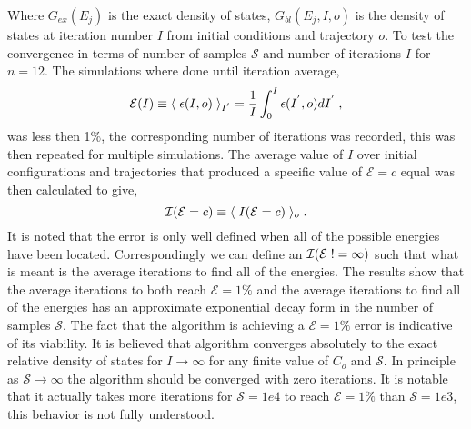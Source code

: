 \documentclass[twocolumn]{article}
\begin{document}
Where $G_{ex}(E_j)$ is the exact density of states, $G_{bl}(E_j,I,o)$ is the density of states at iteration number $I$ from initial conditions and trajectory $o$.
To test the convergence in terms of number of samples $\mathcal{S}$ and number of iterations $I$ for $n=12$.  The simulations where done until iteration average,
\begin{equation}
\mathcal{E}(I) \equiv \langle \hspace{0.1cm} \epsilon(I,o)\hspace{0.1cm}\rangle_{I^{'}} = \frac{1}{I}\int_{0}^{I}\epsilon(I^{'},o)dI^{'} \;,
\end{equation}
 was less then 1$\%$, the corresponding number of iterations was recorded, this was then repeated for multiple simulations. The average value of $I$ over initial configurations and trajectories that produced a specific  value of $\mathcal{E}=c$ equal  was then calculated to give, 
\begin{equation}
 \mathcal{I}(\mathcal{E}=c) \equiv \langle \hspace{0.1cm}  I(\mathcal{E} = c) \hspace{0.1cm}\rangle_{o} \;.
 \end{equation}
 It is noted that the error is only well defined when all of the possible
 energies have been located. Correspondingly we can define an $\mathcal{I}(\mathcal{E}\hspace{0.1cm} != \infty )$ such that what is meant is the average iterations to find all of the energies.  The results show that the average iterations to both reach $\mathcal{E}=1\%$ and the average iterations to find all of the energies has an approximate exponential decay form in the number of samples $\mathcal{S}$. The fact that the algorithm is achieving a $\mathcal{E}=1\%$ error is indicative of its viability. It is believed that algorithm converges absolutely to the exact relative density of states for $I \rightarrow \infty$ for any finite  value of $C_o$ and $\mathcal{S}$. In principle  as $\mathcal{S}\rightarrow \infty$ the algorithm should be converged with zero iterations.  It is notable that it actually takes more iterations for $\mathcal{S}=1e4$ to reach  $\mathcal{E}=1\%$ than $\mathcal{S}=1e3$, this behavior is not fully understood. 
 
\end{document}
